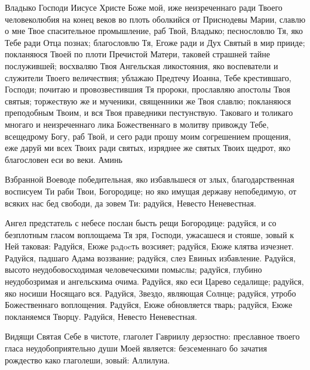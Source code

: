 

Владыко
Господи Иисусе Христе Боже мой, иже неизреченнаго ради Твоего человеколюбия на конец веков во плоть оболкийся от Приснодевы Марии, славлю о мне Твое спасительное промышление, раб Твой, Владыко;
песнословлю Тя, яко Тебе ради Отца познах; благословлю Тя, Егоже ради и Дух Святый в мир прииде; покланяюся Твоей по плоти Пречистой Матери, таковей страшней тайне послужившей; восхваляю Твоя Ангельская ликостояния, яко воспеватели и служители Твоего величествия; ублажаю Предтечу Иоанна, Тебе крестившаго, Господи; почитаю и провозвестившия Тя пророки, прославляю апостолы Твоя святыя; торжествую же и мученики, священники же Твоя славлю; покланяюся преподобным Твоим, и вся Твоя праведники пестунствую. Таковаго и толикаго многаго и неизреченнаго лика Божественнаго в молитву привожду Тебе, всещедрому Богу, раб Твой, и сего ради прошу моим согрешением прощения, еже даруй ми всех Твоих ради святых, изряднее же святых Твоих щедрот, яко благословен еси во веки. Аминь\mychapterending

 


Взбранной Воеводе победительная, яко избавльшеся от злых, благодарственная восписуем Ти раби Твои, Богородице; но яко имущая державу непобедимую, от всяких нас бед свободи, да зовем Ти: радуйся, Невесто Неневестная.



Ангел предстатель с небесе послан бысть рещи Богородице: радуйся, и со безплотным гласом воплощаема Тя зря, Господи, ужасашеся и стояше, зовый к Ней таковая: Радуйся, Еюже рaдocть возсияет; радуйся, Еюже клятва изчезнет. Радуйся, падшаго Адама воззвание; радуйся, слез Евиных избавление. Радуйся, высото неудобовосходимая человеческими помыслы; радуйся, глубино неудобозримая и ангельскима очима. Радуйся, яко еси Царево седалище; радуйся, яко носиши Носящаго вся. Радуйся, Звездо, являющая Солнце; радуйся, утробо Божественнаго воплощения. Радуйся, Еюже обновляется тварь; радуйся, Еюже покланяемся Творцу. Радуйся, Невесто Неневестная.



Видящи Святая Себе в чистоте, глаголет Гавриилу дерзостно: преславное твоего гласа неудобоприятельно души Моей является: безсеменнаго бо зачатия рождество како глаголеши, зовый: Аллилуиа.


